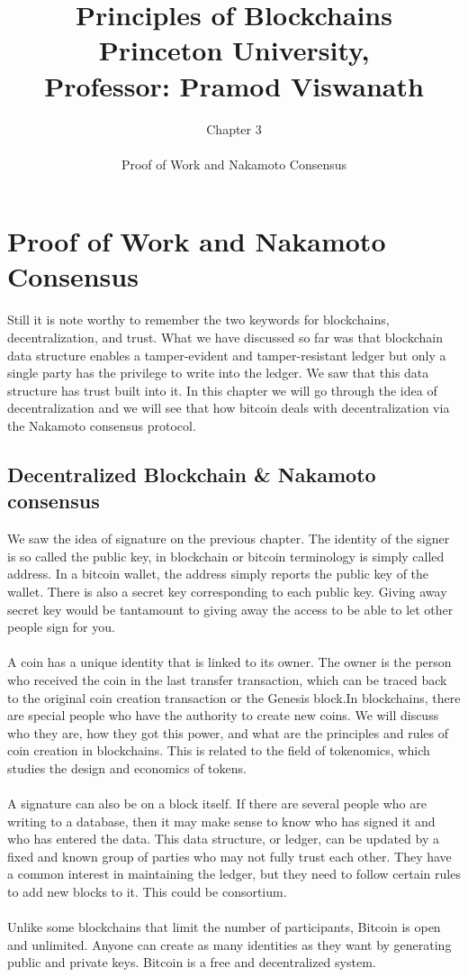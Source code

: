 \documentclass{report}
\title{\Huge{Principles of Blockchains \\ Princeton University,\\
		Professor: Pramod Viswanath}}
\author{\huge{Chapter 3} \\\\ Proof of Work and Nakamoto Consensus}
\begin{document}
\maketitle
\newpage%
\tableofcontents
\pagebreak

\chapter{Proof of Work and Nakamoto Consensus}
Still it is note worthy to remember the two keywords for blockchains, decentralization, and trust. What we have discussed so far was that blockchain data structure enables a tamper-evident and tamper-resistant ledger but only a single party has the privilege to write into the ledger. We saw that this data structure has trust built into it. In this chapter we will go through the idea of decentralization and we will see that how bitcoin deals with decentralization via the Nakamoto consensus protocol.

\section{Decentralized Blockchain \& Nakamoto consensus}
We saw the idea of signature on the previous chapter. The identity of the signer is so called the public key, in blockchain or bitcoin terminology is simply called address. In a bitcoin wallet, the address simply reports the public key of the wallet. There is also a secret key corresponding to each public key. Giving away secret key would be tantamount to giving away the access to be able to let other people sign for you.\\\\
A coin has a unique identity that is linked to its owner. The owner is the person who received the coin in the last transfer transaction, which can be traced back to the original coin creation transaction or the Genesis block.In blockchains, there are special people who have the authority to create new coins. We will discuss who they are, how they got this power, and what are the principles and rules of coin creation in blockchains. This is related to the field of tokenomics, which studies the design and economics of tokens.\\\\
A signature can also be on a block itself.  If there are several people who are writing to a database, then it may make sense to know who has signed it and who has entered the data. This data structure, or ledger, can be updated by a fixed and known group of parties who may not fully trust each other. They have a common interest in maintaining the ledger, but they need to follow certain rules to add new blocks to it. This could be consortium. \\\\
Unlike some blockchains that limit the number of participants, Bitcoin is open and unlimited. Anyone can create as many identities as they want by generating public and private keys. Bitcoin is a free and decentralized system.
\end{document}

